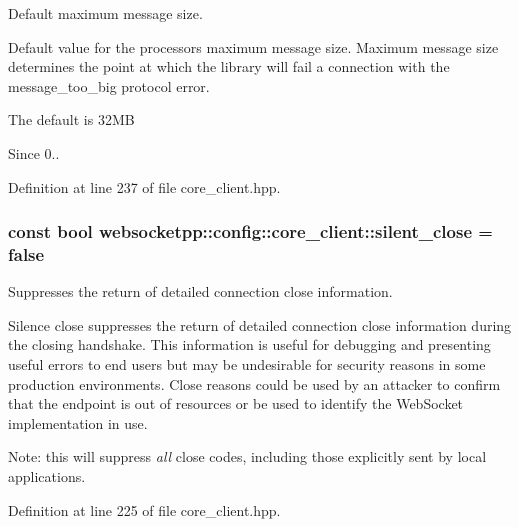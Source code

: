 Default maximum message size. 

Default value for the processor\textquotesingle{}s maximum message size. Maximum message size determines the point at which the library will fail a connection with the message\+\_\+too\+\_\+big protocol error.

The default is 32\+M\+B

\begin{DoxySince}{Since}
0.. 
\end{DoxySince}


Definition at line 237 of file core\+\_\+client.\+hpp.

\hypertarget{structwebsocketpp_1_1config_1_1core__client_affc0279e7717d68fbe5d2bb874f8d4d1}{}
\subsubsection[{silent\+\_\+close}]{\setlength{\rightskip}{0pt plus 5cm}const bool websocketpp\+::config\+::core\+\_\+client\+::silent\+\_\+close = false\hspace{0.3cm}{\ttfamily [static]}}\label{structwebsocketpp_1_1config_1_1core__client_affc0279e7717d68fbe5d2bb874f8d4d1}


Suppresses the return of detailed connection close information. 

Silence close suppresses the return of detailed connection close information during the closing handshake. This information is useful for debugging and presenting useful errors to end users but may be undesirable for security reasons in some production environments. Close reasons could be used by an attacker to confirm that the endpoint is out of resources or be used to identify the Web\+Socket implementation in use.

Note\+: this will suppress {\itshape all} close codes, including those explicitly sent by local applications. 

Definition at line 225 of file core\+\_\+client.\+hpp.

\hypertarget{structwebsocketpp_1_1config_1_1core__client_aa9c3092633bdd220e4a8d9f9ce1581ef}{}
